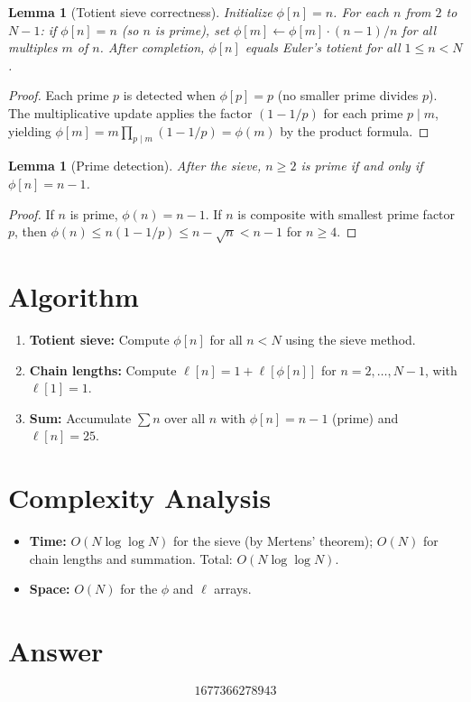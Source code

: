 \documentclass[12pt]{article}
\newtheorem{lemma}[theorem]{Lemma}
\begin{document}
\begin{lemma}[Totient sieve correctness]
Initialize $\phi[n] = n$. For each $n$ from $2$ to $N{-}1$: if $\phi[n] = n$ (so $n$ is prime), set $\phi[m] \leftarrow \phi[m]\cdot(n{-}1)/n$ for all multiples $m$ of $n$. After completion, $\phi[n]$ equals Euler's totient for all $1 \leq n < N$.
\end{lemma}

\begin{proof}
Each prime $p$ is detected when $\phi[p] = p$ (no smaller prime divides $p$). The multiplicative update applies the factor $(1-1/p)$ for each prime $p \mid m$, yielding $\phi[m] = m\prod_{p \mid m}(1-1/p) = \phi(m)$ by the product formula.
\end{proof}

\begin{lemma}[Prime detection]
After the sieve, $n \geq 2$ is prime if and only if $\phi[n] = n - 1$.
\end{lemma}

\begin{proof}
If $n$ is prime, $\phi(n) = n-1$. If $n$ is composite with smallest prime factor $p$, then $\phi(n) \leq n(1-1/p) \leq n-\sqrt{n} < n-1$ for $n \geq 4$.
\end{proof}

\section{Algorithm}

\begin{enumerate}
\item \textbf{Totient sieve:} Compute $\phi[n]$ for all $n < N$ using the sieve method.
\item \textbf{Chain lengths:} Compute $\ell[n] = 1 + \ell[\phi[n]]$ for $n = 2, \ldots, N{-}1$, with $\ell[1]=1$.
\item \textbf{Sum:} Accumulate $\sum n$ over all $n$ with $\phi[n] = n-1$ (prime) and $\ell[n] = 25$.
\end{enumerate}

\section{Complexity Analysis}

\begin{itemize}
\item \textbf{Time:} $O(N\log\log N)$ for the sieve (by Mertens' theorem); $O(N)$ for chain lengths and summation. Total: $O(N\log\log N)$.
\item \textbf{Space:} $O(N)$ for the $\phi$ and $\ell$ arrays.
\end{itemize}

\section{Answer}

\[
\boxed{1677366278943}
\]
\end{document}
